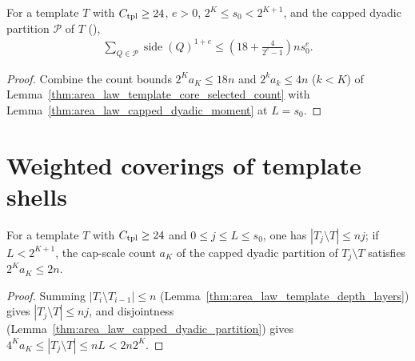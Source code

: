 \begin{lemma}
    \label{thm:area_law_template_weighted_core_cover}
    \leanok
    For a template $T$ with $C_{\rm tpl}\ge24$, $e>0$, $2^K\le s_0<2^{K+1}$, and the capped dyadic partition $\mathcal P$ of $T$ (\cite[Lemma~9.4]{OpenAI2026AreaLaw}),
    \begin{align}
        \sum_{Q\in\mathcal P}\operatorname{side}(Q)^{1+e}
        \le \left(18+\frac{4}{2^e-1}\right)n s_0^e. \label{eq:template_core_cover}
    \end{align}
\end{lemma}
\begin{proof}\leanok
    Combine the count bounds $2^Ka_K\le18n$ and $2^ka_k\le4n$ ($k<K$) of Lemma~\ref{thm:area_law_template_core_selected_count} with Lemma~\ref{thm:area_law_capped_dyadic_moment} at $L=s_0$.
\end{proof}

\section{Weighted coverings of template shells}

\begin{lemma}
    \label{thm:area_template_shell_cap}
    \leanok
    For a template $T$ with $C_{\rm tpl}\ge24$ and $0\le j\le L\le s_0$, one has $|T_j\setminus T|\le nj$; if $L<2^{K+1}$, the cap-scale count $a_K$ of the capped dyadic partition of $T_j\setminus T$ satisfies $2^K a_K\le2n$.
\end{lemma}
\begin{proof}\leanok
    Summing $|T_i\setminus T_{i-1}|\le n$ (Lemma~\ref{thm:area_law_template_depth_layers}) gives $|T_j\setminus T|\le nj$, and disjointness (Lemma~\ref{thm:area_law_capped_dyadic_partition}) gives $4^Ka_K\le|T_j\setminus T|\le nL<2n2^K$.
\end{proof}

